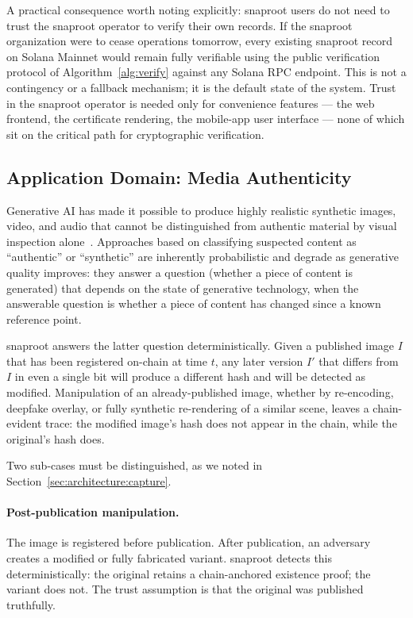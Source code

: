 \documentclass[11pt,a4paper]{article}
\begin{document}
A practical consequence worth noting explicitly: snaproot users do not
need to trust the snaproot operator to verify their own records. If
the snaproot organization were to cease operations tomorrow, every
existing snaproot record on Solana Mainnet would remain fully
verifiable using the public verification protocol of
Algorithm~\ref{alg:verify} against any Solana RPC endpoint. This is
not a contingency or a fallback mechanism; it is the default state of
the system. Trust in the snaproot operator is needed only for
convenience features --- the web frontend, the certificate rendering,
the mobile-app user interface --- none of which sit on the critical
path for cryptographic verification.

\subsection{Application Domain: Media Authenticity}
\label{sec:discussion:media}

Generative AI has made it possible to produce highly realistic
synthetic images, video, and audio that cannot be distinguished from
authentic material by visual inspection
alone~\cite{rossler2019faceforensics, li2018ictuoculi}. Approaches
based on classifying suspected content as ``authentic'' or
``synthetic'' are inherently probabilistic and degrade as generative
quality improves: they answer a question (whether a piece of content
is generated) that depends on the state of generative technology,
when the answerable question is whether a piece of content has
changed since a known reference point.

snaproot answers the latter question deterministically. Given a
published image $I$ that has been registered on-chain at time $t$,
any later version $I'$ that differs from $I$ in even a single bit
will produce a different hash and will be detected as modified.
Manipulation of an already-published image, whether by re-encoding,
deepfake overlay, or fully synthetic re-rendering of a similar scene,
leaves a chain-evident trace: the modified image's hash does not
appear in the chain, while the original's hash does.

Two sub-cases must be distinguished, as we noted in
Section~\ref{sec:architecture:capture}.

\paragraph{Post-publication manipulation.} The image is registered
before publication. After publication, an adversary creates a modified
or fully fabricated variant. snaproot detects this deterministically:
the original retains a chain-anchored existence proof; the variant
does not. The trust assumption is that the original was published
truthfully.
\end{document}
